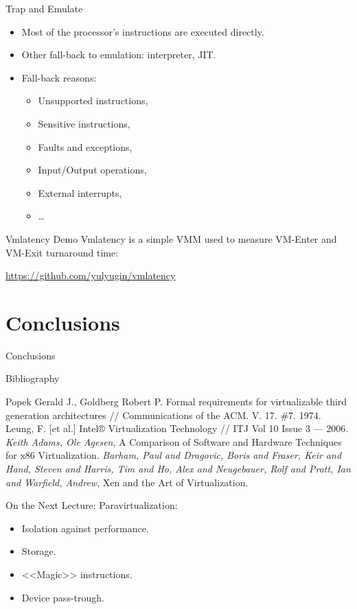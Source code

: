 \begin{frame}{Trap and Emulate}
\begin{itemize}
\item Most of the processor's instructions are executed directly.
\item Other fall-back to emulation: interpreter, JIT.\pause
\item Fall-back reasons:
  \begin{itemize}
  \item Unsupported instructions,
  \item Sensitive instructions,
  \item Faults and exceptions,
  \item Input/Output operations,
  \item External interrupts,
  \item \dots
  \end{itemize}
\end{itemize}
\end{frame}

\begin{frame}{Vmlatency Demo}
Vmlatency is a simple VMM used to measure VM-Enter and VM-Exit turnaround time:

\url{https://github.com/yulyugin/vmlatency}
\end{frame}

\section*{Conclusions}

\begin{frame}{Conclusions}
\tableofcontents
\end{frame}

\begin{frame}[allowframebreaks]{Bibliography}
\begin{thebibliography}{99}
 Popek Gerald J., Goldberg Robert P. Formal requirements for
  virtualizable third generation architectures // Communications of the ACM.
  V. 17. \#7. 1974.
 Leung, F. [et al.] Intel® Virtualization Technology // ITJ Vol
  10 Issue 3 — 2006.
\bibitem{} \textit{Keith Adams, Ole Agesen}, A Comparison of Software and
  Hardware Techniques for x86 Virtualization.
\bibitem{} \textit{Barham, Paul and Dragovic, Boris and Fraser, Keir and Hand,
  Steven and Harris, Tim and Ho, Alex and Neugebauer, Rolf and Pratt, Ian and
  Warfield, Andrew}, Xen and the Art of Virtualization.
\end{thebibliography}
\end{frame}

\begin{frame}{On the Next Lecture:}
  Paravirtualization:
  \begin{itemize}
    \item Isolation against performance.
    \item Storage.
    \item{<<Magic>> instructions}.
    \item Device pass-trough.
  \end{itemize}
\end{frame}

\finalslide


